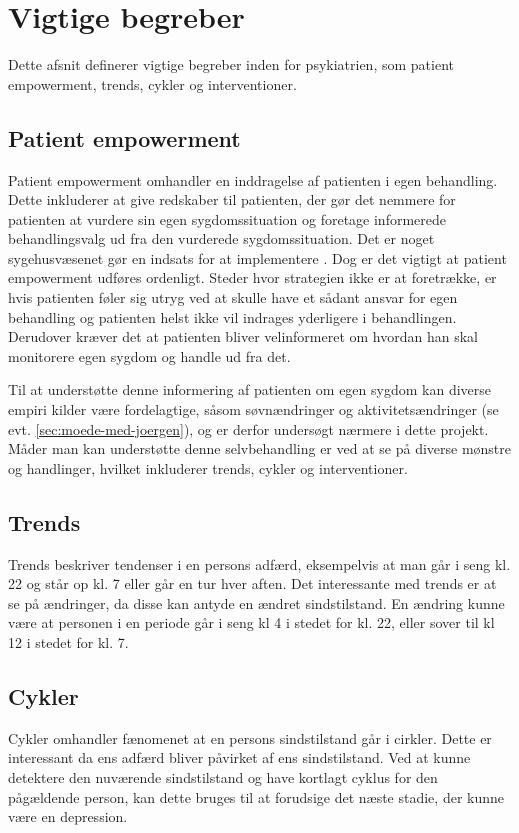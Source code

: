 \section{Vigtige begreber}
Dette afsnit definerer vigtige begreber inden for psykiatrien, som patient empowerment, trends, cykler og interventioner.

\subsection{Patient empowerment}\label{sec:patientempowerment}
Patient empowerment omhandler en inddragelse af patienten i egen behandling.
Dette inkluderer at give redskaber til patienten, der gør det nemmere for patienten at vurdere sin egen sygdomssituation og foretage informerede behandlingsvalg ud fra den vurderede sygdomssituation.
Det er noget sygehusvæsenet gør en indsats for at implementere \citep{misc:patientpowerhovedstaden}.
Dog er det vigtigt at patient empowerment udføres ordenligt.
Steder hvor strategien ikke er at foretrække, er hvis patienten føler sig utryg ved at skulle have et sådant ansvar for egen behandling og patienten helst ikke vil indrages yderligere i behandlingen.
Derudover kræver det at patienten bliver velinformeret om hvordan han skal monitorere egen sygdom og handle ud fra det.

Til at understøtte denne informering af patienten om egen sygdom kan diverse empiri kilder være fordelagtige, såsom søvnændringer og aktivitetsændringer (se evt. \cref{sec:moede-med-joergen}), og er derfor undersøgt nærmere i dette projekt.
Måder man kan understøtte denne selvbehandling er ved at se på diverse mønstre og handlinger, hvilket inkluderer trends, cykler og interventioner.

\subsection{Trends}
Trends beskriver tendenser i en persons adfærd, eksempelvis at man går i seng kl. 22 og står op kl. 7 eller går en tur hver aften.
Det interessante med trends er at se på ændringer, da disse kan antyde en ændret sindstilstand.
En ændring kunne være at personen i en periode går i seng kl 4 i stedet for kl. 22, eller sover til kl 12 i stedet for kl. 7.

\subsection{Cykler}
Cykler omhandler fænomenet at en persons sindstilstand går i cirkler.
Dette er interessant da ens adfærd bliver påvirket af ens sindstilstand.
Ved at kunne detektere den nuværende sindstilstand og have kortlagt cyklus for den pågældende person, kan dette bruges til at forudsige det næste stadie, der kunne være en depression.

